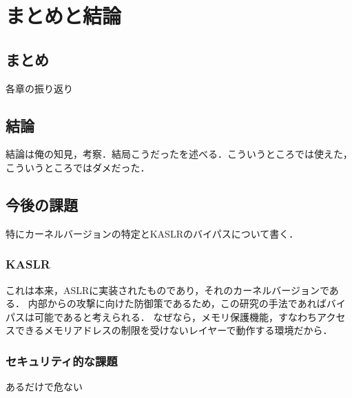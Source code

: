 \chapter{まとめと結論}
\label{chap:conclusion}

\section{まとめ}

各章の振り返り

\section{結論}

結論は俺の知見，考察．結局こうだったを述べる．こういうところでは使えた，こういうところではダメだった．

\section{今後の課題}

特にカーネルバージョンの特定とKASLRのバイパスについて書く．

\subsection{KASLR}

これは本来，ASLRに実装されたものであり，それのカーネルバージョンである．
内部からの攻撃に向けた防御策であるため，この研究の手法であればバイパスは可能であると考えられる．
なぜなら，メモリ保護機能，すなわちアクセスできるメモリアドレスの制限を受けないレイヤーで動作する環境だから．

\subsection{セキュリティ的な課題}

あるだけで危ない
